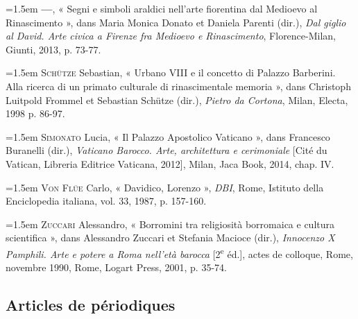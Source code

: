 \documentclass[12pt,twoside,openany]{book}
\newenvironment{PurhBibliography}
  {%
    \par
    \setlength{\parindent}{0pt}%
    \setlength{\leftskip}{0pt}%
  }
  {%
    \par
  }
\begin{document}
\begin{PurhBibliography}
\noindent\hangindent=1.5em \textbf{—}, « Segni e simboli araldici nell’arte fiorentina dal Medioevo al Rinascimento », dans Maria Monica Donato et Daniela Parenti (dir.), \textit{Dal giglio al David. Arte civica a Firenze fra Medioevo e Rinascimento}, Florence-Milan, Giunti, 2013, p. 73-77.\par
\noindent\hangindent=1.5em \textsc{Schütze} Sebastian, « Urbano \textsc{VIII} e il concetto di Palazzo Barberini. Alla ricerca di un primato culturale di rinascimentale memoria », dans Christoph Luitpold Frommel et Sebastian Schütze (dir.), \textit{Pietro da Cortona}, Milan, Electa, 1998 p. 86-97.\par
\noindent\hangindent=1.5em \textsc{Simonato} Lucia, « Il Palazzo Apostolico Vaticano », dans Francesco Buranelli (dir.), \textit{Vaticano Barocco. Arte, architettura e cerimoniale} [Cité du Vatican, Libreria Editrice Vaticana, 2012], Milan, Jaca Book, 2014, chap. \textsc{IV}.\par
\noindent\hangindent=1.5em \textsc{Von Flüe} Carlo, « Davidico, Lorenzo », \textit{DBI}, Rome, Istituto della Enciclopedia italiana, vol. 33, 1987, p. 157-160.\par
\noindent\hangindent=1.5em \textsc{Zuccari} Alessandro, « Borromini tra religiosità borromaica e cultura scientifica », dans Alessandro Zuccari et Stefania Macioce (dir.), \textit{Innocenzo X Pamphili. Arte e potere a Roma nell’età barocca} [2\textsuperscript{e} éd.], actes de colloque, Rome, novembre 1990, Rome, Logart Press, 2001, p. 35-74.\par
\end{PurhBibliography}

\subsection{Articles de périodiques}
\end{document}
